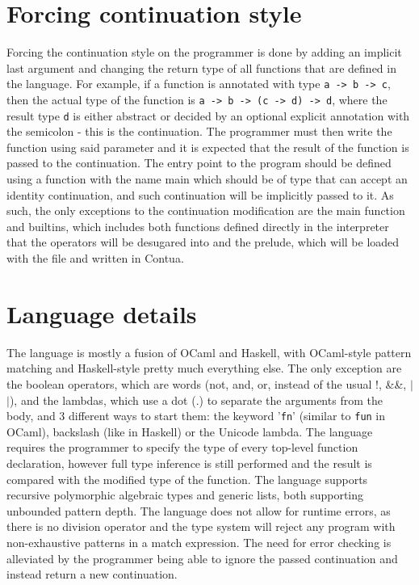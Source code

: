 \documentclass{article}
\begin{document}
	\section{Forcing continuation style}
	Forcing the continuation style on the programmer is done by adding an implicit last argument
	and changing the return type of all functions that are defined in the language.
	For example, if a function is annotated with type \texttt{a -> b -> c},
	then the actual type of the function is \texttt{a -> b -> (c -> d) -> d},
	where the result type \texttt{d} is either abstract or decided by an optional explicit annotation with the semicolon - this is the continuation.
	The programmer must then write the function using said parameter and it is expected that 
	the result of the function is passed to the continuation. The entry point to the program should be defined using a function with the name main which should be of type that can accept an identity continuation, and such continuation will be implicitly passed to it.
	As such, the only exceptions to the continuation modification are the main function and builtins, which includes both functions defined directly in the interpreter that the operators will be desugared into and the prelude, which will be loaded with the file and written in Contua.	
	\section{Language details}
	The language is mostly a fusion of OCaml and Haskell, with OCaml-style pattern matching and
	Haskell-style pretty much everything else. The only exception are the boolean operators,
	which are words (not, and, or, instead of the usual !, \&\&, $|$$|$), and the lambdas, which
	use a dot (.) to separate the arguments from the body, and 3 different ways to start them:
	the keyword '\texttt{fn}' (similar to \texttt{fun} in OCaml), backslash (like in Haskell) or the Unicode lambda.
	The language requires the programmer to specify the type of every top-level function declaration, however full type inference is still performed and the result is compared with the modified type of the function.
	The language supports recursive polymorphic algebraic types and generic lists, both supporting 
	unbounded pattern depth. The language does not allow for runtime errors, as there is no division operator and the type system will reject any program with non-exhaustive patterns in a match expression. The need for error checking is alleviated by the programmer being able to ignore the passed continuation and instead return a new continuation.
\end{document}
